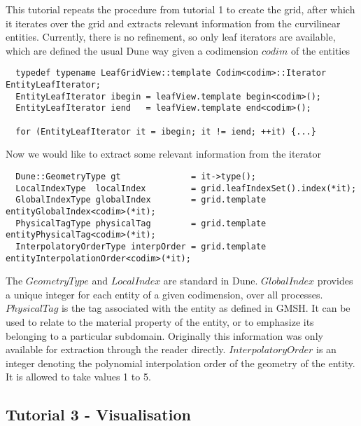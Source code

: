 \documentclass[12pt]{article}
\begin{document}
This tutorial repeats the procedure from tutorial 1 to create the grid, after which it iterates over the grid and extracts relevant information from the curvilinear entities. Currently, there is no refinement, so only leaf iterators are available, which are defined the usual Dune way given a codimension $codim$ of the entities\\

\begin{mybox}
\begin{lstlisting}
  typedef typename LeafGridView::template Codim<codim>::Iterator EntityLeafIterator;
  EntityLeafIterator ibegin = leafView.template begin<codim>();
  EntityLeafIterator iend   = leafView.template end<codim>();
  
  for (EntityLeafIterator it = ibegin; it != iend; ++it) {...}
\end{lstlisting}
\end{mybox}


Now we would like to extract some relevant information from the iterator \\
\begin{mybox}
\begin{lstlisting}
  Dune::GeometryType gt              = it->type();
  LocalIndexType  localIndex         = grid.leafIndexSet().index(*it);
  GlobalIndexType globalIndex        = grid.template entityGlobalIndex<codim>(*it);
  PhysicalTagType physicalTag        = grid.template entityPhysicalTag<codim>(*it);
  InterpolatoryOrderType interpOrder = grid.template entityInterpolationOrder<codim>(*it);
\end{lstlisting}
\end{mybox}

The $GeometryType$ and $LocalIndex$ are standard in Dune. $GlobalIndex$ provides a unique integer for each entity of a given codimension, over all processes. $PhysicalTag$ is the tag associated with the entity as defined in GMSH. It can be used to relate to the material property of the entity, or to emphasize its belonging to a particular subdomain. Originally this information was only available for extraction through the reader directly. $InterpolatoryOrder$ is an integer denoting the polynomial interpolation order of the geometry of the entity. It is allowed to take values 1 to 5.


\subsection{Tutorial 3 - Visualisation}
\end{document}
